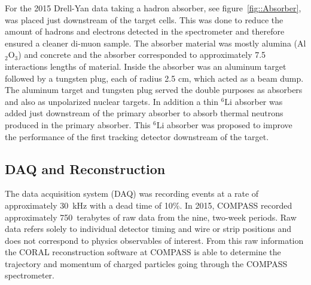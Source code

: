 For the 2015 Drell-Yan data taking a hadron absorber,
see figure~\ref{fig::Absorber}, was placed just downstream of the target
cells.  This was done to reduce the amount of hadrons and electrons
detected in the spectrometer and therefore ensured a cleaner di-muon
sample.  The absorber material was mostly alumina (Al$_2$O$_3$) and
concrete and the absorber corresponded to approximately 7.5
interactions lengths of material.  Inside the absorber was an aluminum
target followed by a tungsten plug, each of radius 2.5 cm, which acted
as a beam dump.  The aluminum target and tungsten plug served the
double purposes as absorbers and also as unpolarized nuclear targets.
In addition a thin $^6\mathrm{Li}$ absorber was added just downstream of the
primary absorber to absorb thermal neutrons produced in the primary
absorber.  This $^6\mathrm{Li}$ absorber was proposed to improve the
performance of the first tracking detector downstream of the
target. \par

\subsection{DAQ and Reconstruction}
The data acquisition system (DAQ) was recording events at a rate of
approximately 30~kHz with a dead time of 10\%.  In 2015, COMPASS
recorded approximately 750~terabytes of raw data from the nine,
two-week periods.  Raw data refers solely to individual detector
timing and wire or strip positions and does not correspond to physics
observables of interest.  From this raw information the CORAL
reconstruction software at COMPASS is able to determine the trajectory
and momentum of charged particles going through the COMPASS
spectrometer.

